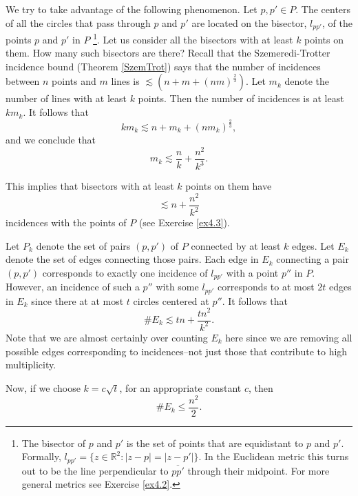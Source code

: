 \documentclass[]{stml-l}
\numberwithin{equation}{chapter}
\theoremstyle{plain}
\theoremstyle{definition}
\theoremstyle{remark}
\begin{document}
We try to take advantage of the following phenomenon. Let $p, p'
\in P$. The centers of all the circles that pass through $p$ and
$p'$ are located on the bisector, $l_{pp'}$,  of the points $p$
and $p'$ in $P$ \footnote{The bisector of $p$ and $p'$ is the set
of points that are equidistant to $p$ and $p'$.  Formally,
$l_{pp'}= \{ z \in \mathbb{R}^2 : |z-p|=|z-p'| \}$.  In the
Euclidean metric this turns out to be the line perpendicular to
$\overline{pp'}$ through their midpoint.  For more general metrics
see Exercise \ref{ex4.2}.}.  Let us consider all the bisectors
with at least $k$ points on them. How many such bisectors are
there? Recall that the Szemeredi-Trotter incidence bound (Theorem
\ref{SzemTrot}) says that the number of incidences between $n$
points and $m$ lines is $\lesssim (n+m+{(nm)}^{\frac{2}{3}})$. Let
$m_k$ denote the number of lines with at least $k$ points. Then
the number of incidences is at least $km_k$. It follows that
\begin{equation}
km_k \lesssim n+m_k+{(nm_k)}^{\frac{2}{3}},
\end{equation}
 and we
conclude that
\begin{equation} \label{richlines}
m_k \lesssim \frac{n}{k}+\frac{n^2}{k^3}.
\end{equation}



This implies that bisectors with at least $k$ points on them have
\begin{equation} \label{richlines2}
\lesssim n+\frac{n^2}{k^2}
\end{equation}
incidences with the points of $P$ (see Exercise \ref{ex4.3}).  


Let $P_k$ denote the set of pairs $(p,p')$ of $P$ connected by
at least $k$ edges. Let $E_k$ denote the set of edges connecting
those pairs. Each edge in $E_k$ connecting a pair $(p,p')$
corresponds to exactly one incidence of $l_{pp'}$ with a point
$p''$ in $P$. However, an incidence of such a $p''$ with some
$l_{pp'}$ corresponds to at most $2t$ edges in $E_k$ since there
at at most $t$ circles centered at $p''$. It follows that
\begin{equation}
 \# E_k \lesssim tn+\frac{tn^2}{k^2}.
\end{equation}
Note that we are almost certainly over counting $E_k$ here since we are removing all possible edges corresponding to incidences--not just those that contribute to high multiplicity.


Now, if we choose $k=c\sqrt{t}$, for an appropriate constant $c$, then
\begin{equation}
 \# E_k \leq \frac{n^2}{2}.
\end{equation}
\end{document}
